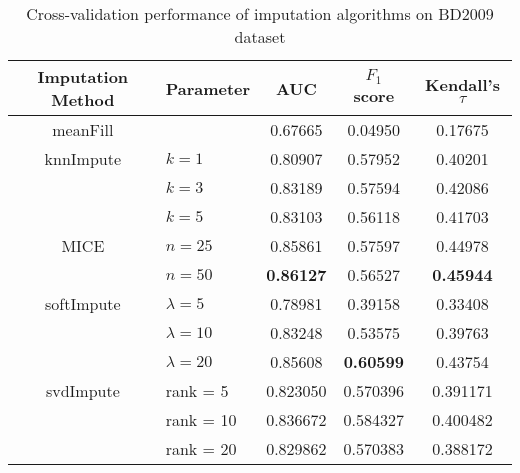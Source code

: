 \begin{table}[htbp]
\centering
\begin{tabular}{cl||ccc}
\toprule
Imputation Method & Parameter & AUC & $F_1$ score & Kendall's $\tau$ \\
\midrule 
meanFill & &   0.67665 &  0.04950 &  0.17675 \\
\midrule
knnImpute & $k = 1$ &  0.80907 &  0.57952 &  0.40201 \\
  & $k = 3$  &  0.83189 &  0.57594 &  0.42086 \\
  & $k = 5$ &  0.83103 &  0.56118 &  0.41703 \\
\midrule
MICE & $n = 25$  &  0.85861 &  0.57597 &  0.44978 \\
     & $n = 50$  &  {\bf 0.86127} &  0.56527 &  {\bf 0.45944} \\
\midrule
softImpute & $\lambda=5$ &  0.78981 &  0.39158 &  0.33408 \\
& $\lambda=10$ &  0.83248 &  0.53575 &  0.39763 \\
& $\lambda=20$ &  0.85608 &  {\bf 0.60599} &  0.43754 \\
             
\midrule
svdImpute & rank = 5  &  0.823050 &  0.570396 &  0.391171 \\
& rank = 10  &  0.836672 &  0.584327 &  0.400482 \\
& rank = 20  &  0.829862 &  0.570383 &  0.388172 \\
\bottomrule[1.25pt]
\end{tabular}
\begin{center}
\caption{Cross-validation performance of imputation algorithms on BD2009 dataset} \label{tab:imputation}
\end{center}
\end{table}

